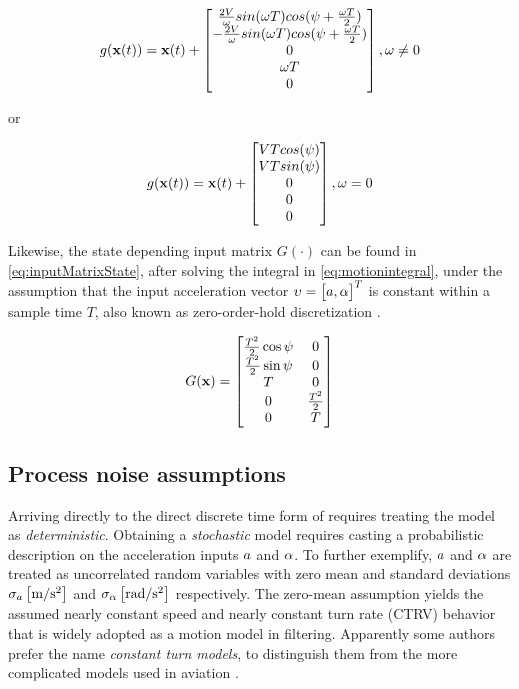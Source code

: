 \begin{equation}
g(\mathbf{x}(t)) = \mathbf{x}(t) +  \begin{bmatrix}
\frac{2{V}}{\omega}sin(\omega T)cos({\psi} + \frac{\omega T}{2})\\
-\frac{2{V}}{\omega}sin(\omega T)cos({\psi} + \frac{\omega T}{2})\\
0 \\
\omega T \\
0
\end{bmatrix} , \omega \neq 0
\end{equation}

or


\begin{equation}
g(\mathbf{x}(t)) = \mathbf{x}(t) +  \begin{bmatrix}
{V} T cos({\psi})\\
{V} T sin({\psi})\\
0 \\
0 \\
0
\end{bmatrix} ,  \omega = 0
\end{equation}

Likewise, the state depending input matrix $G(\cdot)$ can be found in \eqref{eq:inputMatrixState}, after solving the integral in \eqref{eq:motionintegral}, under the assumption that the input acceleration vector ${\upsilon} =\left[\begin{matrix}{a}, {\alpha}\end{matrix}\right]^T$ is constant within a sample time $T$, also known as zero-order-hold discretization \cite{6916122}.

\begin{equation}\label{eq:inputMatrixState}
G(\mathbf{x}) = \left[\begin{matrix}\frac{T^2}{2}\cos {\psi} &0\\ \frac{T^2}{2}\sin{\psi} &0 \\T &0\\0 &\frac{T^2}{2} \\0 &T\end{matrix}\right]
\end{equation}
\subsection{Process noise assumptions}
Arriving directly to the direct discrete time form of  requires treating the model as \emph{deterministic}. Obtaining a \emph{stochastic} model requires casting a probabilistic description on the acceleration inputs ${a}$ and ${\alpha}$. To further exemplify, ${a}$ and ${\alpha}$ are treated as uncorrelated random variables with zero mean and standard deviations $\sigma_{{a}} \left[\si{\meter\per\second^2}\right]$ and $\sigma_{{\alpha}} \left[\si{\radian\per\second^2}\right]$ respectively. The zero-mean assumption yields the assumed nearly constant speed and nearly constant turn rate (CTRV) behavior that is widely adopted as a motion model in filtering. Apparently some authors prefer the name \emph{constant turn models}, to distinguish them from the more complicated models used in aviation \cite{Li2003}.

